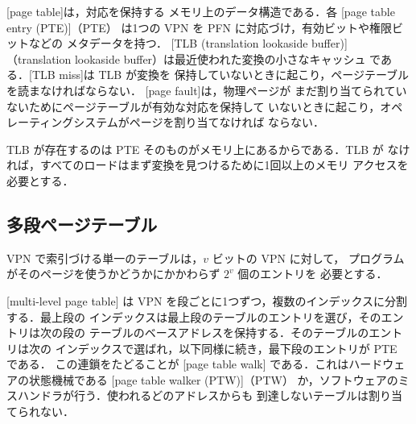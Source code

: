\documentclass[../main.tex]{subfiles}
\begin{document}
\begin{definition}
  \label{def:l07-tlb}
  [page table]は，対応を保持する
  メモリ上のデータ構造である．各
  [page table entry (PTE)]（PTE）
  は1つの VPN を PFN に対応づけ，有効ビットや権限ビットなどの
  メタデータを持つ．
  [TLB (translation lookaside buffer)]
  （translation lookaside buffer）は最近使われた変換の小さなキャッシュ
  である．[TLB miss]は TLB が変換を
  保持していないときに起こり，ページテーブルを読まなければならない．
  [page fault]は，物理ページが
  まだ割り当てられていないためにページテーブルが有効な対応を保持して
  いないときに起こり，オペレーティングシステムがページを割り当てなければ
  ならない．
\end{definition}

%
TLB が存在するのは PTE そのものがメモリ上にあるからである．TLB が
なければ，すべてのロードはまず変換を見つけるために1回以上のメモリ
アクセスを必要とする．

\subsection{多段ページテーブル}

VPN で索引づける単一のテーブルは，$v$ ビットの VPN に対して，
プログラムがそのページを使うかどうかにかかわらず $2^{v}$ 個のエントリを
必要とする．

\begin{definition}[多段ページテーブルとページテーブルウォーク]
  \label{def:l07-multilevel}
  [multi-level page table]
  は VPN を段ごとに1つずつ，複数のインデックスに分割する．最上段の
  インデックスは最上段のテーブルのエントリを選び，そのエントリは次の段の
  テーブルのベースアドレスを保持する．そのテーブルのエントリは次の
  インデックスで選ばれ，以下同様に続き，最下段のエントリが PTE である．
  この連鎖をたどることが
  [page table walk]
  である．これはハードウェアの状態機械である
  [page table walker (PTW)]（PTW）
  か，ソフトウェアのミスハンドラが行う．使われるどのアドレスからも
  到達しないテーブルは割り当てられない．
\end{definition}
\end{document}
